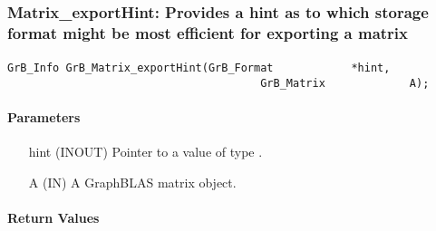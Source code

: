 
\subsubsection{{\sf Matrix\_exportHint}: Provides a hint as to which storage format might be most efficient for exporting a matrix }
\label{Sec:Matrix_exportHint}

\paragraph{\syntax}

\begin{Verbatim}[samepage=true]    
        GrB_Info GrB_Matrix_exportHint(GrB_Format            *hint,
                                       GrB_Matrix             A);
\end{Verbatim}

\paragraph{Parameters}

\begin{itemize}[leftmargin=1.1in]
    \item[{\sf hint}] ({\sf INOUT}) Pointer to a value of type .
    \item[{\sf A}]      ({\sf IN}) A GraphBLAS matrix object.
\end{itemize}

\paragraph{Return Values}

